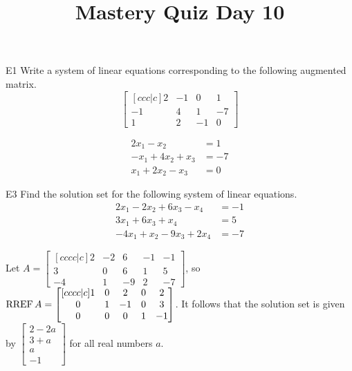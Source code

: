\documentclass{sbgLAquiz}
\title{Mastery Quiz Day 10 }
\begin{document}
\begin{problem}{E1}
Write a system of linear equations corresponding to the following
augmented matrix.
\[
\begin{bmatrix}[ccc|c]
2 & -1 & 0 & 1  \\
-1 & 4 & 1 & -7  \\
1 & 2 & -1 & 0
\end{bmatrix}
\]
\end{problem}
\begin{solution}
\begin{align*}
2x_1-x_2&=1 \\
-x_1+4x_2+x_3&=-7 \\
x_1+2x_2-x_3 &= 0
\end{align*}
\end{solution}

\begin{problem}{E3}
Find the solution set for the following system of linear equations.
\begin{align*}
2x_1-2x_2+6x_3-x_4 &=-1 \\
3x_1+6x_3+x_4 &= 5 \\
-4x_1+x_2-9x_3+2x_4&=-7
\end{align*}
\end{problem}
\begin{solution}
Let \(A =
  \begin{bmatrix}[cccc|c]
    2 & -2 & 6 & -1 & -1 \\
    3 & 0 & 6 & 1 & 5 \\
    -4 & 1 & -9 & 2 & -7
  \end{bmatrix}
\), so \(\operatorname{RREF} A =
  \begin{bmatrix}[cccc|c]
    1 & 0 & 2 & 0 & 2 \\
    0 & 1 & -1 & 0 & 3 \\
    0 & 0 & 0 & 1 & -1
  \end{bmatrix}
\). It follows that the solution set is given by \(
  \begin{bmatrix}
    2 - 2a \\
    3 + a \\
    a \\
    -1
  \end{bmatrix}
\) for all real numbers \(a\).
\end{solution}
\end{document}
